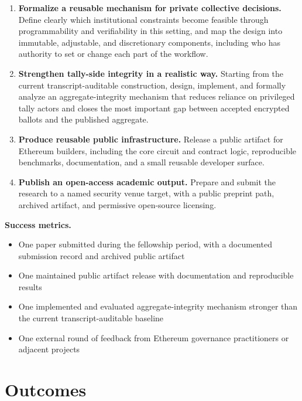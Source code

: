 \documentclass[11pt]{article}
\begin{document}
\begin{enumerate}[leftmargin=*]
\item \textbf{Formalize a reusable mechanism for private collective
decisions.} Define clearly which institutional constraints become feasible
through programmability and verifiability in this setting, and map the design
into immutable, adjustable, and discretionary components, including who has
authority to set or change each part of the workflow.

\item \textbf{Strengthen tally-side integrity in a realistic way.} Starting from
the current transcript-auditable construction, design, implement, and formally
analyze an aggregate-integrity mechanism that reduces reliance on privileged
tally actors and closes the most important gap between accepted encrypted
ballots and the published aggregate.

\item \textbf{Produce reusable public infrastructure.} Release a public artifact
for Ethereum builders, including the core circuit and contract logic,
reproducible benchmarks, documentation, and a small reusable developer surface.

\item \textbf{Publish an open-access academic output.} Prepare and submit the
research to a named security venue target, with a public preprint path,
archived artifact, and permissive open-source licensing.
\end{enumerate}

\textbf{Success metrics.}
\begin{itemize}[leftmargin=*,nosep]
\item One paper submitted during the fellowship period, with a documented
      submission record and archived public artifact
\item One maintained public artifact release with documentation and reproducible results
\item One implemented and evaluated aggregate-integrity mechanism stronger than
      the current transcript-auditable baseline
\item One external round of feedback from Ethereum governance practitioners or
      adjacent projects
\end{itemize}


\section{Outcomes}
\end{document}
